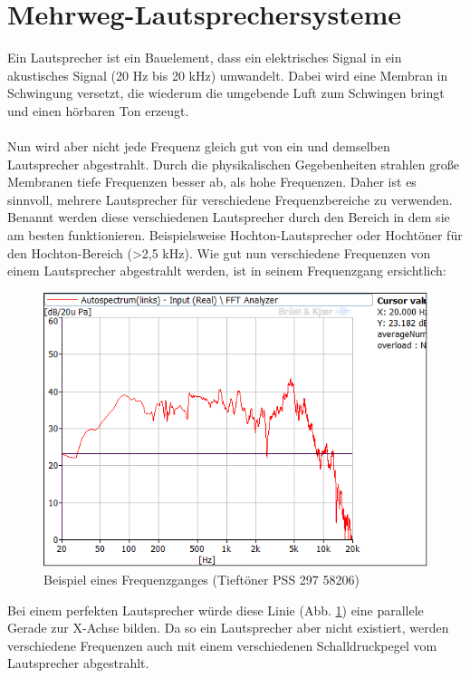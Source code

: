 \newpage
\section{Mehrweg-Lautsprechersysteme}\label{sec:3.2}
Ein Lautsprecher ist ein Bauelement, dass ein elektrisches Signal in ein akustisches Signal (20 Hz bis 20 kHz) umwandelt.
Dabei wird eine Membran in Schwingung versetzt, die wiederum die umgebende Luft zum Schwingen bringt und einen hörbaren Ton erzeugt.
\\ \\
Nun wird aber nicht jede Frequenz gleich gut von ein und demselben Lautsprecher abgestrahlt.
Durch die physikalischen Gegebenheiten strahlen große Membranen tiefe Frequenzen besser ab, als hohe Frequenzen.
Daher ist es sinnvoll, mehrere Lautsprecher für verschiedene Frequenzbereiche zu verwenden.
Benannt werden diese verschiedenen Lautsprecher durch den Bereich in dem sie am besten funktionieren.
Beispielsweise Hochton-Lautsprecher oder Hochtöner für den Hochton-Bereich (>2,5 kHz).
Wie gut nun verschiedene Frequenzen von einem Lautsprecher abgestrahlt werden, ist in seinem Frequenzgang ersichtlich:
\begin{figure} [H]
	\centering
	\includegraphics[width=1\textwidth]{img/LSMessung/TT1_9,17l_bestes.png}
	\caption{Beispiel eines Frequenzganges (Tieftöner PSS 297 58206)}
	\label{fig:3.2.1}
\end{figure}
Bei einem perfekten Lautsprecher würde diese Linie (Abb. \ref{fig:3.2.1}) eine parallele Gerade zur X-Achse bilden.
Da so ein Lautsprecher aber nicht existiert, werden verschiedene Frequenzen auch mit einem verschiedenen Schalldruckpegel vom Lautsprecher abgestrahlt.
